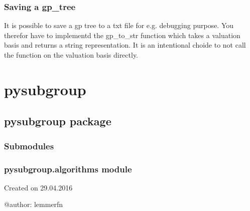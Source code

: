 \documentclass[letterpaper,10pt,english]{sphinxmanual}
\begin{document}
\subsection{Saving a gp\_tree}
\label{\detokenize{gp_growth:saving-a-gp-tree}}
It is possible to save a gp tree to a txt file for e.g. debugging purpose. You therefor have to implementd the gp\_to\_str function which takes a valuation basis and returns a string representation.
It is an intentional choide to not call the   function on the valuation basis directly.

\begin{sphinxVerbatim}[commandchars=\\\{\}]
    
\end{sphinxVerbatim}


\chapter{pysubgroup}
\label{\detokenize{source/modules:pysubgroup}}\label{\detokenize{source/modules::doc}}

\section{pysubgroup package}
\label{\detokenize{source/pysubgroup:pysubgroup-package}}\label{\detokenize{source/pysubgroup::doc}}

\subsection{Submodules}
\label{\detokenize{source/pysubgroup:submodules}}

\subsection{pysubgroup.algorithms module}
\label{\detokenize{source/pysubgroup:module-pysubgroup.algorithms}}\label{\detokenize{source/pysubgroup:pysubgroup-algorithms-module}}
Created on 29.04.2016

@author: lemmerfn
\end{document}
